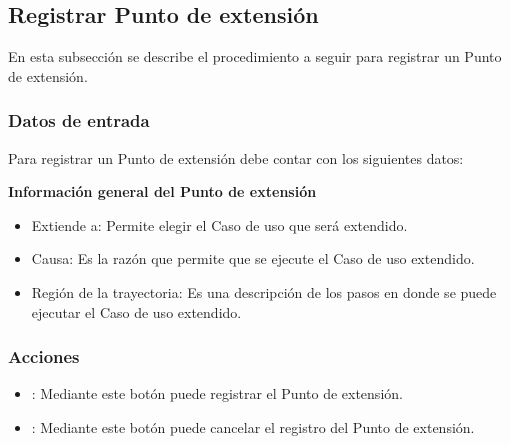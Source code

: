 \subsection{Registrar Punto de extensión}
En esta subsección se describe el procedimiento a seguir para registrar un Punto de extensión.

\subsubsection*{Datos de entrada}
\begin{description}
	\item Para registrar un Punto de extensión debe contar con los siguientes datos: \hspace{10pt}
	
	\begin{description}
	    \item \textbf{Información general del Punto de extensión}
	    \begin{itemize}
		  \item Extiende a: Permite elegir el Caso de uso que será extendido.
		  \item Causa: Es la razón que permite que se ejecute el Caso de uso extendido.
		  \item Región de la trayectoria: Es una descripción de los pasos en donde se puede ejecutar el Caso de uso extendido.
	    \end{itemize}
	 \end{description}
\end{description}

\subsubsection*{Acciones}
\begin{itemize}
  \item {}: Mediante este botón puede registrar el Punto de extensión.
  \item {}: Mediante este botón puede cancelar el registro del Punto de extensión.
\end{itemize}
	
	
